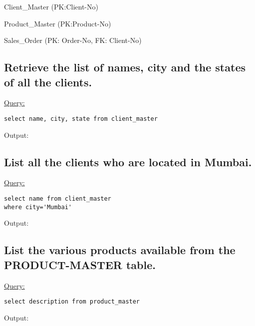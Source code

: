 \documentclass[a4paper,11pt]{article}
\begin{document}
\LARGE{Client\_Master (PK:Client-No)}

\bigskip

\bigskip

\footnotesize{}

\bigskip
\LARGE{Product\_Master  (PK:Product-No)}

\bigskip
\large{}

\bigskip
\LARGE{Sales\_Order (PK: Order-No, FK: Client-No)}

\bigskip

\bigskip
\subsection{Retrieve the list of names, city and the states of all the clients.}
\underline{Query:}
\begin{lstlisting}[showstringspaces=false]
select name, city, state from client_master
\end{lstlisting}
Output:
\begin{figure}[H]
\centering
{}
\end{figure}
\bigskip

\subsection{List all the clients who are located in Mumbai.}
\underline{Query:}
\begin{lstlisting}[showstringspaces=false]
select name from client_master
where city='Mumbai'
\end{lstlisting}
Output:
\begin{figure}[H]
\centering
{}
\end{figure}
\bigskip

\subsection{List the various products available from the PRODUCT-MASTER table.}
\underline{Query:}
\begin{lstlisting}[showstringspaces=false]
select description from product_master
\end{lstlisting}
Output:
\begin{figure}[H]
\centering
{}
\end{figure}
\bigskip
\end{document}
